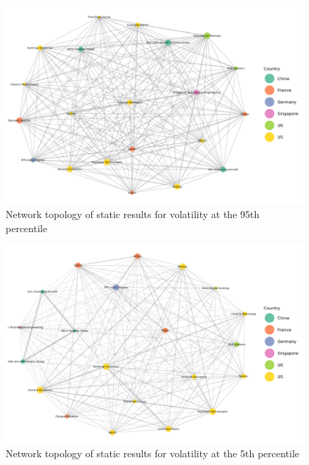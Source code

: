 \documentclass[
  number]{elsarticle}
\begin{document}
\begin{figure}[H]

{\centering \includegraphics[width=6.75in,height=\textheight]{plots/fig-vol95.png}

}

\caption{\label{fig-vol95}Network topology of static results for
volatility at the 95th percentile}

\end{figure}

\begin{figure}[H]

{\centering \includegraphics[width=6.75in,height=\textheight]{plots/fig-vol5.png}

}

\caption{\label{fig-vol5}Network topology of static results for
volatility at the 5th percentile}

\end{figure}
\end{document}

